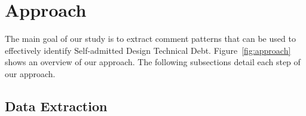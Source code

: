 \documentclass[conference]{IEEEtran}
\newcommand{\SADTD}{Self-admitted Design Technical Debt\xspace}
\begin{document}
\begin{table}[!hbt]
\begin{center}
\begin{tabular}{ p{3in} | p{3in} }
			\bottomrule
		\end{tabular}
	\end{center}
\end{table}





\section{Approach}
\label{sec:approach}

The main goal of our study is to extract comment patterns that can be used to effectively identify \SADTD. Figure~\ref{fig:approach} shows an overview of our approach. The following subsections detail each step of our approach.
 
\subsection{Data Extraction}
\end{document}
